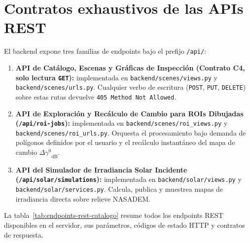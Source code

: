 \documentclass[11pt,a4paper]{article}
\newcommand{\src}[1]{\nolinkurl{#1}}
\newcommand{\gz}{\ensuremath{\gamma^{0}}}
\begin{document}
\section{Contratos exhaustivos de las APIs REST}
\label{sec:arq-apis-rest}

El backend expone tres familias de endpoints bajo el prefijo \texttt{/api/}:
\begin{enumerate}
  \item \textbf{API de Catálogo, Escenas y Gráficas de Inspección (Contrato C4, solo lectura \texttt{GET}):}
        implementada en \src{backend/scenes/views.py} y \src{backend/scenes/urls.py}. Cualquier verbo de
        escritura (\texttt{POST}, \texttt{PUT}, \texttt{DELETE}) sobre estas rutas devuelve \texttt{405 Method Not Allowed}.
  \item \textbf{API de Exploración y Recálculo de Cambio para ROIs Dibujadas (\texttt{/api/roi-jobs}):}
        implementada en \src{backend/scenes/roi\_views.py} y \src{backend/scenes/roi\_urls.py}. Orquesta el
        procesamiento bajo demanda de polígonos definidos por el usuario y el recálculo instantáneo del mapa de
        cambio $\Delta\gz_{\mathrm{dB}}$.
  \item \textbf{API del Simulador de Irradiancia Solar Incidente (\texttt{/api/solar/simulations}):}
        implementada en \src{backend/solar/views.py} y \src{backend/solar/services.py}. Calcula, publica y
        muestrea mapas de irradiancia directa sobre relieve NASADEM.
\end{enumerate}

La tabla~\ref{tab:endpoints-rest-catalogo} resume todos los endpoints REST disponibles en el servidor, sus
parámetros, códigos de estado HTTP y contratos de respuesta.
\end{document}

